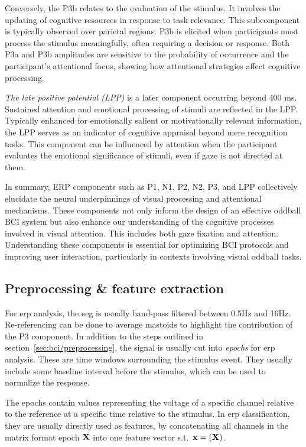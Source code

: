 Conversely, the P3b relates to the evaluation of the stimulus.
It involves the updating of cognitive resources in response to task relevance.
This subcomponent is typically observed over parietal regions.
P3b is elicited when participants must process the stimulus meaningfully,
often requiring a decision or response.
Both P3a and P3b amplitudes are sensitive to the probability of occurrence
and the participant's attentional focus, showing how attentional strategies
affect cognitive processing.

\emph{The late positive potential (LPP)} is a later component occurring beyond 400 ms.
Sustained attention and emotional processing of stimuli are reflected in the
LPP.
Typically enhanced for emotionally salient or motivationally relevant
information, the LPP serves as an indicator of cognitive appraisal beyond mere
recognition tasks.
This component can be influenced by attention when the participant evaluates
the emotional significance of stimuli, even if gaze is not directed at them.

In summary, ERP components such as P1, N1, P2, N2, P3, and LPP collectively
elucidate the neural underpinnings of visual processing and attentional
mechanisms.
These components not only inform the design of an effective oddball BCI system
but also enhance our understanding of the cognitive processes involved in visual
attention.
This includes both gaze fixation and attention.
Understanding these components is essential for optimizing BCI protocols and
improving user interaction, particularly in contexts involving visual oddball
tasks.

\subsection{Preprocessing \& feature extraction}
For \ac{erp} analysis, the \ac{eeg} is usually band-pass filtered between 0.5Hz
and 16Hz.
Re-referencing can be done to average mastoids to highlight the contribution of
the P3 component.
In addition to the steps outlined in section~\ref{sec:bci/preprocessing},
the signal is usually cut into \emph{epochs} for \ac{erp} analysis.
These are time windows surrounding the stimulus event.
They usually include some baseline interval before the stimulus, which can be
used to normalize the response.

The epochs contain values representing the voltage of a specific channel relative to the
reference at a specific time relative to the stimulus.
In \ac{erp} classification, they are usually directly used as features, by
concatenating all channels in the matrix format epoch $\mathbf{X}$ into one feature
vector s.t.\ $\mat{x} = \mat\vec(\mat{X})$.

